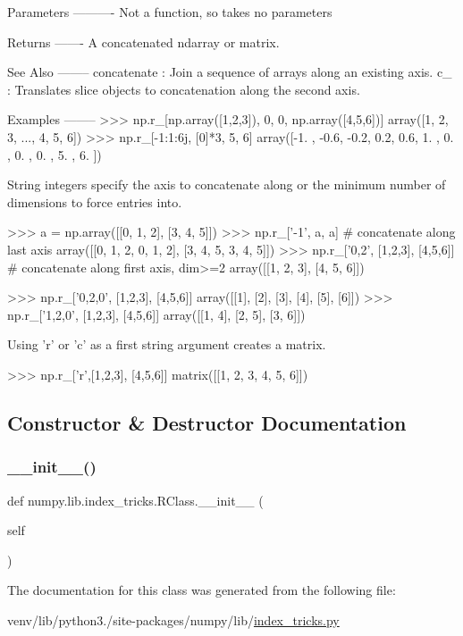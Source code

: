 \begin{DoxyVerb}
Parameters
----------
Not a function, so takes no parameters


Returns
-------
A concatenated ndarray or matrix.

See Also
--------
concatenate : Join a sequence of arrays along an existing axis.
c_ : Translates slice objects to concatenation along the second axis.

Examples
--------
>>> np.r_[np.array([1,2,3]), 0, 0, np.array([4,5,6])]
array([1, 2, 3, ..., 4, 5, 6])
>>> np.r_[-1:1:6j, [0]*3, 5, 6]
array([-1. , -0.6, -0.2,  0.2,  0.6,  1. ,  0. ,  0. ,  0. ,  5. ,  6. ])

String integers specify the axis to concatenate along or the minimum
number of dimensions to force entries into.

>>> a = np.array([[0, 1, 2], [3, 4, 5]])
>>> np.r_['-1', a, a] # concatenate along last axis
array([[0, 1, 2, 0, 1, 2],
       [3, 4, 5, 3, 4, 5]])
>>> np.r_['0,2', [1,2,3], [4,5,6]] # concatenate along first axis, dim>=2
array([[1, 2, 3],
       [4, 5, 6]])

>>> np.r_['0,2,0', [1,2,3], [4,5,6]]
array([[1],
       [2],
       [3],
       [4],
       [5],
       [6]])
>>> np.r_['1,2,0', [1,2,3], [4,5,6]]
array([[1, 4],
       [2, 5],
       [3, 6]])

Using 'r' or 'c' as a first string argument creates a matrix.

>>> np.r_['r',[1,2,3], [4,5,6]]
matrix([[1, 2, 3, 4, 5, 6]])\end{DoxyVerb}
 

\subsection{Constructor \& Destructor Documentation}
\mbox{\label{classnumpy_1_1lib_1_1index__tricks_1_1RClass_ab0bfa0de53b310c803b10d035c052e66}} 
\subsubsection{\texorpdfstring{\+\_\+\+\_\+init\+\_\+\+\_\+()}{\_\_init\_\_()}}
{\footnotesize\ttfamily def numpy.\+lib.\+index\+\_\+tricks.\+R\+Class.\+\_\+\+\_\+init\+\_\+\+\_\+ (\begin{DoxyParamCaption}\item[{}]{self }\end{DoxyParamCaption})}



The documentation for this class was generated from the following file\+:\begin{DoxyCompactItemize}
\item 
venv/lib/python3./site-\/packages/numpy/lib/\hyperlink{lib_2index__tricks_8py}{index\+\_\+tricks.\+py}\end{DoxyCompactItemize}

